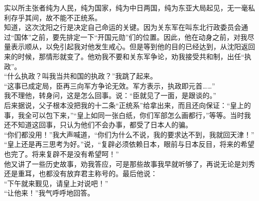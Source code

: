 实以所主张者纯为人民，纯为国家，纯为中日两国，纯为东亚大局起见，无一毫私利存乎其间，故不能不正统系。\\

知道，这次沈阳之行是决定自己命运的关键。因为关东军在叫东北行政委员会通过“国体”之前，要先排定一下“开国元勋”们的位置。因此，他在动身之前，对我尽量表示顺从，以免引起我对他发生戒心。但是等到他的目的已经达到，从沈阳返回来的时候，那情形就变了。他劝我不要和关东军争论，劝我接受共和制，出任“执政”。\\

“什么执政？叫我当共和国的执政？”我跳了起来。\\

“这事已成定局，臣再三向军方争论无效。军方表示，执政即元首……”\\

我不理他，转身问，这是怎么回事。说：“臣就见了一面，是跟谈的。”\\

后来据说，父子根本没把我的十二条“正统系”给拿出来，而且还向保证：“皇上的事，我全可以包下来，”“皇上如同一张白纸，你们军部怎么画都行，”等等。当时我还不知道这回事，只认为他们不会办事，都受了日本人的骗。\\

“你们都没用！”我大声喊道，“你们为什么不说，我的要求达不到，我就回天津！”\\

“皇上还是再三思考为好。”说，“复辟必须依赖日本，眼前与日本反目，将来的希望也完了。将来复辟不是没有希望呵！”\\

他又讲了一些历史故事，劝我答应，可是那些故事我早就听够了，再说无论是刘秀还是重耳，也都没有放弃君主称号的。最后他说：\\

“下午就来觐见，请皇上对说吧！”\\

“让他来！”我气呼呼地回答。